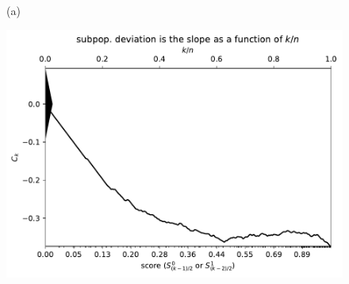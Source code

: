 \documentclass{article}
\newlength{\vertsep}
\newlength{\imsize}
\begin{document}
\clearpage



\begin{figure}
\begin{centering}

(a)
\parbox{\imsize}{\includegraphics[width=\imsize]
{../codes/unweighted/nll-1-248-Eskimo-dog-husky_293-cheetah-chetah-Acinonyx-jubatus.pdf}}

\vspace{\vertsep}


\end{centering}
\end{figure}
\end{document}

